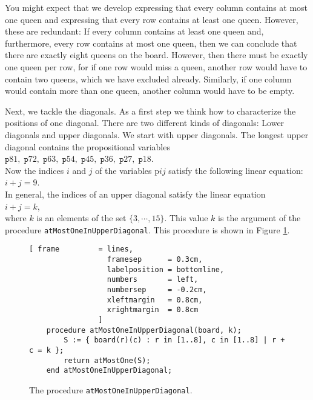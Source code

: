 You might expect that we develop \formulae expressing that every column contains at most
one queen and \formulae expressing that every row contains at least one queen.
However, these \formulae are redundant:  If every column contains at least one queen and,
furthermore, every row contains at most one queen, then we can conclude that 
there are exactly eight queens on the board.  However, then there must be exactly one
queen per row, for if one row would miss a queen, another row would have to contain two
queens, which we have excluded already.  Similarly, if one column would contain more than
one queen, another column would have to be empty.


Next, we tackle the diagonals.
As a first step we think how to characterize the positions of one diagonal.
There are two different kinds of diagonals: Lower diagonals and upper diagonals.
We start with upper diagonals.  The longest upper diagonal contains the propositional variables
\\[0.2cm]
\hspace*{1.3cm} 
$\texttt{p}81,\; \texttt{p}72,\; \texttt{p}63,\; \texttt{p}54,\; \texttt{p}45,\; \texttt{p}36,\; 
 \texttt{p}27,\; \texttt{p}18$. 
\\[0.2cm]
Now the indices $i$ and $j$ of the variables $\mathrm{p}ij$ satisfy the following linear equation: \\[0.2cm]
\hspace*{1.3cm} 
$i + j = 9$. 
\\[0.2cm]
In general, the indices of an upper diagonal satisfy the linear equation 
\\[0.2cm]
\hspace*{1.3cm} 
$i + j = k$, \\[0.2cm]
where $k$ is an elements of the set $\{3, \cdots, 15 \}$.  This value  $k$ is the argument
of the procedure   \texttt{atMostOneInUpperDiagonal}. This procedure is shown in Figure
\ref{fig:atMostOneInUpperDiagonal}.

\begin{figure}[!ht]
  \centering
\begin{Verbatim}[ frame         = lines, 
                  framesep      = 0.3cm, 
                  labelposition = bottomline,
                  numbers       = left,
                  numbersep     = -0.2cm,
                  xleftmargin   = 0.8cm,
                  xrightmargin  = 0.8cm
                ]
    procedure atMostOneInUpperDiagonal(board, k);
        S := { board(r)(c) : r in [1..8], c in [1..8] | r + c = k };
        return atMostOne(S);
    end atMostOneInUpperDiagonal;
\end{Verbatim}
\vspace*{-0.3cm}
  \caption{The procedure \texttt{atMostOneInUpperDiagonal}.}
  \label{fig:atMostOneInUpperDiagonal}
\end{figure}

